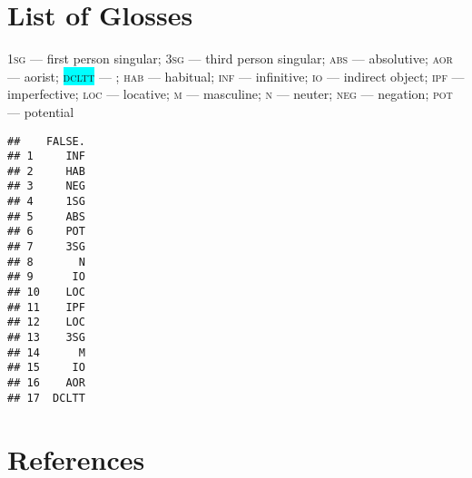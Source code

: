 \documentclass[
]{article}
\begin{document}
\hypertarget{list-of-glosses}{%
\section{List of Glosses}\label{list-of-glosses}}

\textsc{1sg} --- first person singular; \textsc{3sg} --- third person
singular; \textsc{abs} --- absolutive; \textsc{aor} --- aorist;
\textsc{\colorbox{cyan}{dcltt}} --- ; \textsc{hab} --- habitual;
\textsc{inf} --- infinitive; \textsc{io} --- indirect object;
\textsc{ipf} --- imperfective; \textsc{loc} --- locative; \textsc{m} ---
masculine; \textsc{n} --- neuter; \textsc{neg} --- negation;
\textsc{pot} --- potential

\begin{verbatim}
##    FALSE.
## 1     INF
## 2     HAB
## 3     NEG
## 4     1SG
## 5     ABS
## 6     POT
## 7     3SG
## 8       N
## 9      IO
## 10    LOC
## 11    IPF
## 12    LOC
## 13    3SG
## 14      M
## 15     IO
## 16    AOR
## 17  DCLTT
\end{verbatim}

\hypertarget{references}{%
\section{References}\label{references}}
\end{document}
